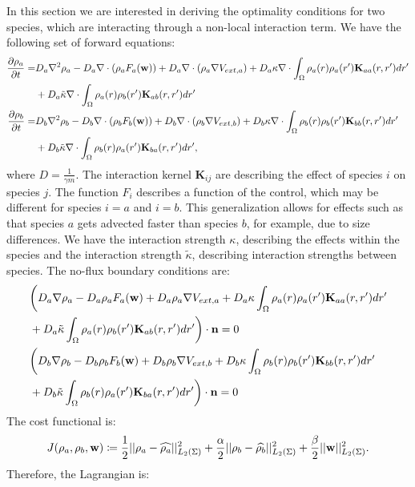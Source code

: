 	In this section we are interested in deriving the optimality conditions for two species, which are interacting through a non-local interaction term.
	We have the following set of forward equations:
	\begin{align*}
	\frac{\partial \rho_a}{\partial t} =& D_a\nabla^2 \rho_a - D_a\nabla \cdot(\rho_a F_a(\mathbf{w})) + D_a \nabla \cdot (\rho_a \nabla V_{ext,a}) + D_a\kappa \nabla \cdot \int_\Omega \rho_a(r) \rho_a (r') \mathbf{K}_{aa}(r,r')dr' \\
	&+  D_a\tilde{\kappa}\nabla \cdot \int_\Omega \rho_a(r) \rho_b (r') \mathbf{K}_{ab}(r,r')dr'\\
	\frac{\partial \rho_b}{\partial t} =& D_b\nabla^2 \rho_b - D_b\nabla \cdot(\rho_b F_b(\mathbf{w})) + D_b \nabla \cdot (\rho_b \nabla V_{ext,b}) + D_b\kappa \nabla \cdot \int_\Omega \rho_b(r) \rho_b (r') \mathbf{K}_{bb}(r,r')dr' \\
	&+  D_b\tilde{\kappa} \nabla \cdot \int_\Omega \rho_b(r) \rho_a (r') \mathbf{K}_{ba}(r,r')dr',
	\end{align*}
	where $D = \frac{1}{\gamma m}$. The interaction kernel $\mathbf K_{ij}$ are describing the effect of species $i$ on species $j$. The function $F_i$ describes a function of the control, which may be different for species $i = a$ and $i = b$. This generalization allows for effects such as that species $a$ gets advected faster than species $b$, for example, due to size differences. We have the interaction strength $\kappa$, describing the effects within the species and the interaction strength $\tilde \kappa$, describing interaction strengths between species.
	The no-flux boundary conditions are:
	\begin{align*}
	&\bigg( D_a \nabla \rho_a - D_a \rho_a F_a(\mathbf{w}) + D_a \rho_a \nabla V_{ext,a} + D_a\kappa \int_\Omega \rho_a(r) \rho_a (r') \mathbf{K}_{aa}(r,r')dr' \\
	&+  D_a\tilde{\kappa} \int_\Omega \rho_a(r) \rho_b (r') \mathbf{K}_{ab}(r,r')dr' \bigg) \cdot \mathbf{n} = 0\\
	&\bigg( D_b \nabla \rho_b - D_b \rho_b F_b(\mathbf{w}) + D_b \rho_b \nabla V_{ext,b} + D_b\kappa \int_\Omega \rho_b(r) \rho_b (r')\mathbf{K}_{bb}(r,r')dr' \\
	&+  D_b\tilde{\kappa} \int_\Omega \rho_b(r) \rho_a (r') \mathbf{K}_{ba}(r,r')dr' \bigg) \cdot \mathbf{n} = 0
	\end{align*}
	The cost functional is:
	\begin{align*}
	J(\rho_a,\rho_b, \mathbf{w}) \coloneqq \frac{1}{2}|| \rho_a - \widehat{\rho_a} ||^2_{L_2(\Sigma)} + \frac{\alpha}{2}|| \rho_b - \widehat {\rho_b} ||^2_{L_2(\Sigma)} + \frac{\beta}{2}||\mathbf{w}||^2_{L_2(\Sigma)}.
	\end{align*}
	Therefore, the Lagrangian is:
